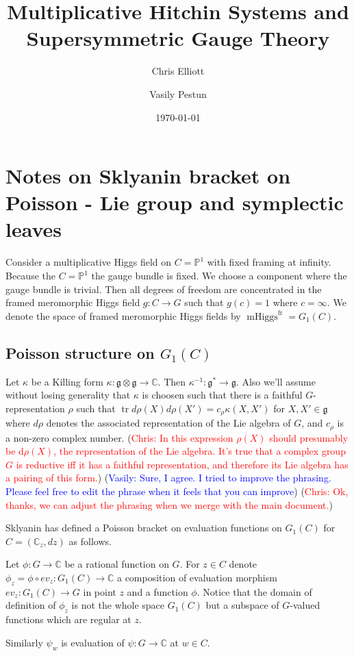 \documentclass[11pt, oneside, reqno]{amsart}
\title{Multiplicative Hitchin Systems and Supersymmetric Gauge Theory}
\author{Chris Elliott \and Vasily Pestun}
\date{\today}
\theoremstyle{definition} \newtheorem{definition}{Definition}[section]
\theoremstyle{definition} \newtheorem{remark}[definition]{Remark}
\theoremstyle{definition} \newtheorem{remarks}[definition]{Remarks}
\theoremstyle{definition} \newtheorem{question}[definition]{Question}
\theoremstyle{definition} \newtheorem*{note}{Note}
\theoremstyle{definition} \newtheorem{example}[definition]{Example}
\theoremstyle{definition} \newtheorem{examples}[definition]{Examples}
\renewcommand{\gg}{\mathfrak{g}}
\DeclareMathOperator{\tr}{tr}
\DeclareMathOperator{\mhiggs}{mHiggs}
\renewcommand{\d}{\mathrm{d}}
\newcommand{\fr}{\mathrm{fr}}
\newcommand{\chris}[1]{(\textcolor{red}{Chris: #1})}
\newcommand{\vasily}[1]{(\textcolor{blue}{Vasily: #1})}
\begin{document}
\section{Notes on Sklyanin bracket on Poisson - Lie group
  and symplectic leaves}

Consider a multiplicative Higgs field on $C = \mathbb{P}^{1}$
with fixed framing at infinity. Because the $C = \mathbb{P}^{1}$ the
gauge bundle is fixed. We choose a component where the gauge bundle is trivial.
Then all degrees of freedom are concentrated
in the framed meromorphic Higgs field $g: C \to G$ such that $g(c) = 1$ where $c = \infty$. We denote
the space of framed meromorphic Higgs fields by $\mhiggs^{\fr} = G_1(C)$. 

\subsection{Poisson structure on $G_1(C)$} 
Let $\kappa$ be a Killing form $\kappa: \gg \otimes \gg \to \mathbb{C}$.
Then $\kappa^{-1} \colon \gg^{*} \to \gg$. Also we'll assume  without losing generality that $\kappa$ is choosen such that
there is a faithful $G$-representation $\rho$ such that 
$\tr d\rho(X) d\rho(X') = c_\rho \kappa(X, X') $ for $X , X' \in \gg$
where $d\rho$ denotes the associated representation of the Lie algebra of $G$,
and $c_{\rho}$ is a non-zero complex number.  \chris{In this expression $\rho(X)$ should presumably be $\d \rho(X)$, the representation of the Lie algebra.  It's true that a complex group $G$ is reductive iff it has a faithful representation, and therefore its Lie algebra has a pairing of this form.}
\vasily{Sure, I agree. I tried to improve the phrasing.
  Please feel free to edit the phrase when it feels that you can
  improve} \chris{Ok, thanks, we can adjust the phrasing when we merge with the main document.}

Sklyanin has defined a Poisson bracket on evaluation functions on $G_1(C)$ for $C = (\mathbb{C}_z, dz)$ as follows. 

Let $\phi: G \to \mathbb{C}$ be a rational function on $G$.
For $z \in C$ denote $\phi_{z} =  \phi \circ ev_{z} : G_1(C) \to \mathbb{C}$ a composition of evaluation morphism  $ev_{z}: G_1(C) \to G$ in point $z$ and a function $\phi$. Notice that the domain of definition of
$\phi_{z}$ is not the whole space $G_{1}(C)$ but a subspace of
$G$-valued functions which are regular at $z$. 

Similarly $\psi_{w}$ is evaluation of $\psi: G \to \mathbb{C}$ at $w \in C$. 
\end{document}
